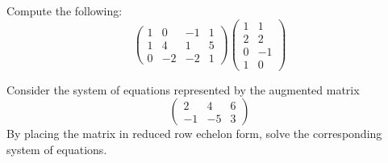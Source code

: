 \documentclass[12pt,letterpaper]{exam}
\begin{document}
\begin{questions}





\newpage
\question[12] Compute the following:
	\[
	\begin{pmatrix}
	1 & 0 & -1 & 1 \\
	1 & 4 & 1 & 5 \\
	0 & -2 & -2 & 1 
	\end{pmatrix}
	\begin{pmatrix}
	1 & 1 \\
	2 & 2 \\
	0 & -1 \\
	1 & 0
	\end{pmatrix}
	\]





\newpage
\question[10] Consider the system of equations represented by the augmented matrix
	\[
	\begin{pmatrix}
	2 & 4 & 6 \\
	-1 & -5 & 3
	\end{pmatrix}
	\]
By placing the matrix in reduced row echelon form, solve the corresponding system of equations. 


\end{questions}
\end{document}
